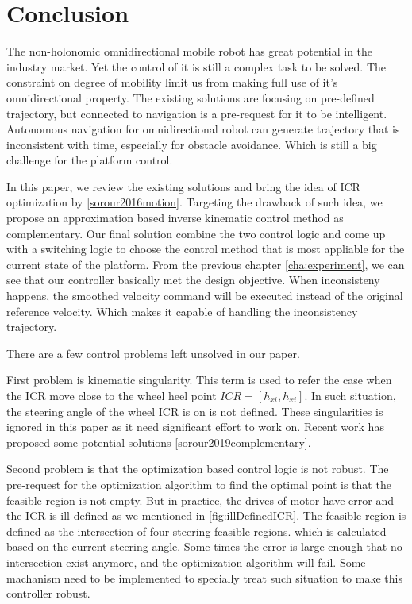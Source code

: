 \chapter{Conclusion}
\label{cha:conclusion}

The non-holonomic omnidirectional mobile robot has great potential in the industry market. Yet the control of it is still a complex task to be solved. The constraint on degree of mobility limit us from making full use of it's omnidirectional property. The existing solutions are focusing on pre-defined trajectory, but connected to navigation is a pre-request for it to be intelligent. Autonomous navigation for omnidirectional robot can generate trajectory that is inconsistent with time, especially for obstacle avoidance. Which is still a big challenge for the platform control.




In this paper, we review the existing solutions and bring the idea of ICR optimization by \cref{sorour2016motion}. Targeting the drawback of such idea, we propose an approximation based inverse kinematic control method as complementary. Our final solution combine the two control logic and come up with a switching logic to choose the control method that is most appliable for the current state of the platform. From the previous chapter \cref{cha:experiment}, we can see that our controller basically met the design objective. When inconsisteny happens, the smoothed velocity command will be executed instead of the original reference velocity. Which makes it capable of handling the inconsistency trajectory. \par\medskip

There are a few control problems left unsolved in our paper.

First problem is kinematic singularity. This term is used to refer the case when the ICR move close to the wheel heel point $ICR=[h_{xi},h_{xi}]$. In such situation, the steering angle of the wheel ICR is on is not defined. These singularities is ignored in this paper as it need significant effort to work on. Recent work has proposed some potential solutions \cref{sorour2019complementary}.

Second problem is that the optimization based control logic is not robust. The pre-request for the optimization algorithm to find the optimal point is that the feasible region is not empty. But in practice, the drives of motor have error and the ICR is ill-defined as we mentioned in \cref{fig:illDefinedICR}. The feasible region is defined as the intersection of four steering feasible regions. which is calculated based on the current steering angle. Some times the error is large enough that no  intersection exist anymore, and the optimization algorithm will fail. Some machanism need to be implemented to specially treat such situation to make this controller robust.